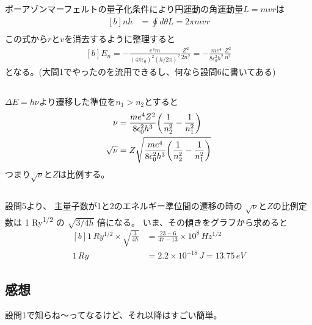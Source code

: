 \documentclass[../../master.tex]{subfiles}
\begin{document}
\subsection{}
ボーアゾンマーフェルトの量子化条件により円運動の角運動量\(L=mvr\)は
\begin{equation}\begin{aligned}[b]
    nh &= \oint d\theta L = 2\pi mvr\\
\end{aligned}\end{equation}
この式から\(r\)と\(v\)を消去するように整理すると
\begin{equation}\begin{aligned}[b]
    E_n = -\frac{e^4m}{(4\pi\epsilon_0)^2(h/2\pi)^2}\frac{Z^2}{2n^2}
    = -\frac{me^4}{8\epsilon_0^2h^2}\frac{Z^2}{n^2}
\end{aligned}\end{equation}
となる。(大問1でやったのを流用できるし、何なら設問6に書いてある)

\subsection{}
\(\Delta E=h\nu\)より遷移した準位を\(n_1>n_2\)とすると
\begin{equation}\begin{aligned}[b]
    \nu &= \frac{me^4Z^2}{8\epsilon_0^2h^3}\qty(\frac{1}{n_2^2}-\frac{1}{n_1^2})\\
    \sqrt{\nu} &= Z\sqrt{\frac{me^4}{8\epsilon_0^2h^3}\qty(\frac{1}{n_2^2}-\frac{1}{n_1^2})}
\end{aligned}\end{equation}
つまり\(\sqrt{\nu}\)と\(Z\)は比例する。

\subsection{}
設問5より、
主量子数が1と2のエネルギー準位間の遷移の時の
\(\sqrt{\nu}\)と\(Z\)の比例定数は 1 \si{Ry^{1/2}} の \(\sqrt{3/4h}\) 倍になる。
いま、その傾きをグラフから求めると
\begin{equation}\begin{aligned}[b]
    1\,\si{Ry^{1/2}}\times \sqrt{\frac{3}{4h}} &= \frac{23-6}{47-13} \times 10^8 \,\si{Hz^{1/2}}\\
    1 \,\si{Ry} &= 2.2\times10^{-18} \,\si{J} = 13.75 \,\si{eV}
\end{aligned}\end{equation}

\subsection{}


\subsection*{感想}
設問1で知らね～ってなるけど、それ以降はすごい簡単。
\end{document}
